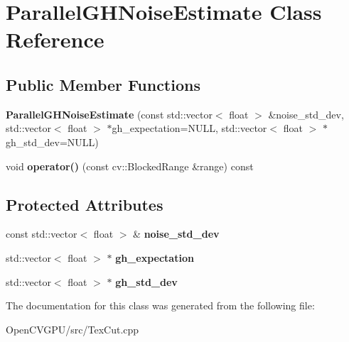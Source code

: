 \hypertarget{class_parallel_g_h_noise_estimate}{}\section{Parallel\+G\+H\+Noise\+Estimate Class Reference}
\label{class_parallel_g_h_noise_estimate}
\subsection*{Public Member Functions}
\begin{DoxyCompactItemize}
\item 
\hypertarget{class_parallel_g_h_noise_estimate_ae7042ec4aa6417cae78868b4f7c9d89d}{}\label{class_parallel_g_h_noise_estimate_ae7042ec4aa6417cae78868b4f7c9d89d} 
{\bfseries Parallel\+G\+H\+Noise\+Estimate} (const std\+::vector$<$ float $>$ \&noise\+\_\+std\+\_\+dev, std\+::vector$<$ float $>$ $\ast$gh\+\_\+expectation=N\+U\+LL, std\+::vector$<$ float $>$ $\ast$gh\+\_\+std\+\_\+dev=N\+U\+LL)
\item 
\hypertarget{class_parallel_g_h_noise_estimate_a3b1b75166a1c46e6d123674af2c16823}{}\label{class_parallel_g_h_noise_estimate_a3b1b75166a1c46e6d123674af2c16823} 
void {\bfseries operator()} (const cv\+::\+Blocked\+Range \&range) const
\end{DoxyCompactItemize}
\subsection*{Protected Attributes}
\begin{DoxyCompactItemize}
\item 
\hypertarget{class_parallel_g_h_noise_estimate_a6af686f2e186d90f2b9d3cb92deaa5fa}{}\label{class_parallel_g_h_noise_estimate_a6af686f2e186d90f2b9d3cb92deaa5fa} 
const std\+::vector$<$ float $>$ \& {\bfseries noise\+\_\+std\+\_\+dev}
\item 
\hypertarget{class_parallel_g_h_noise_estimate_a09994589b00ad8b93eec1308c6598047}{}\label{class_parallel_g_h_noise_estimate_a09994589b00ad8b93eec1308c6598047} 
std\+::vector$<$ float $>$ $\ast$ {\bfseries gh\+\_\+expectation}
\item 
\hypertarget{class_parallel_g_h_noise_estimate_a099e0f9a90dca73482b3a67d9cf07490}{}\label{class_parallel_g_h_noise_estimate_a099e0f9a90dca73482b3a67d9cf07490} 
std\+::vector$<$ float $>$ $\ast$ {\bfseries gh\+\_\+std\+\_\+dev}
\end{DoxyCompactItemize}


The documentation for this class was generated from the following file\+:\begin{DoxyCompactItemize}
\item 
Open\+C\+V\+G\+P\+U/src/Tex\+Cut.\+cpp\end{DoxyCompactItemize}
